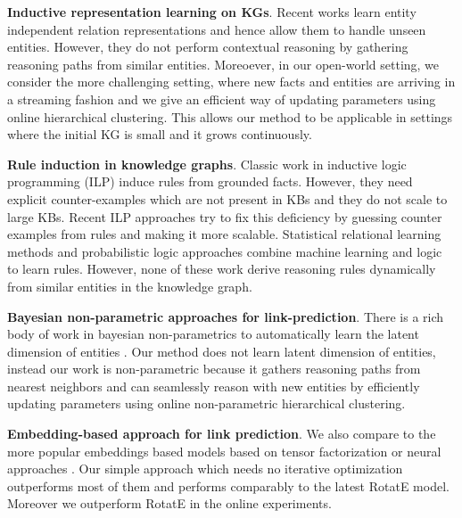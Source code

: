 \documentclass[11pt,a4paper]{article}
\begin{document}
\noindent\textbf{Inductive representation learning on KGs}. Recent works \cite{teru2019inductive,wang2020entity} learn entity independent relation representations and hence allow them to handle unseen entities. However, they do not perform contextual reasoning by gathering reasoning paths from similar entities. Moreoever, in our open-world setting, we consider the more challenging setting, where new facts and entities are arriving in a streaming fashion and we give an efficient way of updating parameters using online hierarchical clustering. This allows our method to be applicable in settings where the initial KG is small and it grows continuously.

\noindent\textbf{Rule induction in knowledge graphs}. Classic work in inductive logic programming (ILP) \cite{muggleton1992inductive,quinlan1990learning} induce rules from grounded facts. However, they need explicit counter-examples which are not present in KBs and they do not scale to large KBs. Recent ILP approaches \cite{galarraga2013amie,galarraga2015fast} try to fix this deficiency by guessing counter examples from rules and making it more scalable. Statistical relational learning methods \cite{getoor2007introduction,kok2007,schoenmackers2010learning} and probabilistic logic approaches \cite{richardson2006markov,broecheler,wang2013programming} combine machine learning and logic to learn rules. However, none of these work derive reasoning rules dynamically from similar entities in the knowledge graph. 

\noindent\textbf{Bayesian non-parametric approaches for link-prediction}. There is a rich body of work in bayesian non-parametrics to automatically learn the latent dimension of entities \cite{kemp2006learning,xu2006infinite}. Our method does not learn latent dimension of entities, instead our work is non-parametric because it gathers reasoning paths from nearest neighbors and can seamlessly reason with new entities by efficiently updating parameters using online non-parametric hierarchical clustering.

\textbf{Embedding-based approach for link prediction}. We also compare to the more popular embeddings based models based on tensor factorization or neural approaches \cite{nickel2011three,bordes2013translating,dettmers2018convolutional,sun2019rotate}. Our simple approach which needs no iterative optimization outperforms most of them and performs comparably to the latest RotatE model. Moreover we outperform RotatE in the online experiments.
\end{document}

